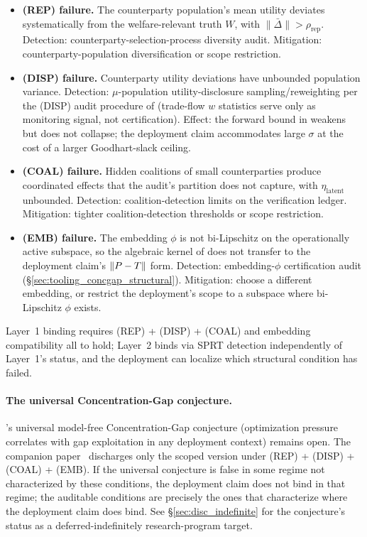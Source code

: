 \begin{itemize}
\item \textbf{(REP) failure.}  The counterparty population's mean
  utility deviates systematically from the welfare-relevant truth
  $W$, with $\|\bar\Delta\| > \rho_{\mathrm{rep}}$.  Detection:
  counterparty-selection-process diversity audit.  Mitigation:
  counterparty-population diversification or scope restriction.

\item \textbf{(DISP) failure.}  Counterparty utility deviations
  have unbounded population variance.  Detection: $\mu$-population
  utility-disclosure sampling/reweighting per the (DISP) audit
  procedure of \citep[\S 6]{lasser2026foundations} (trade-flow
  $w$ statistics serve only as monitoring signal, not
  certification).  Effect: the forward bound in
  \citep[Theorem~2]{lasser2026foundations} weakens but does not
  collapse; the deployment claim accommodates large $\sigma$ at
  the cost of a larger Goodhart-slack ceiling.

\item \textbf{(COAL) failure.}  Hidden coalitions of small
  counterparties produce coordinated effects that the audit's
  partition does not capture, with
  $\eta_{\mathrm{latent}}$ unbounded.  Detection:
  coalition-detection limits on the verification ledger.
  Mitigation: tighter coalition-detection thresholds or scope
  restriction.

\item \textbf{(EMB) failure.}  The embedding $\phi$ is not
  bi-Lipschitz on the operationally active subspace, so the
  algebraic kernel of \citep[Theorem~2]{lasser2026foundations}
  does not transfer to the deployment claim's $\|P -
  T\|$ form.  Detection: embedding-$\phi$ certification
  audit (\S\ref{sec:tooling_concgap_structural}).  Mitigation:
  choose a different embedding, or restrict the deployment's
  scope to a subspace where bi-Lipschitz $\phi$ exists.
\end{itemize}

Layer~1 binding requires (REP) + (DISP) + (COAL) and embedding
compatibility all to hold; Layer~2 binds via SPRT detection
independently of Layer~1's status, and the deployment can
localize which structural condition has failed.

\paragraph{The universal Concentration-Gap conjecture.}
\citep[Microfoundation]{lasser2026micro}'s universal model-free
Concentration-Gap conjecture (optimization pressure correlates
with gap exploitation in any deployment context) remains open.
The companion paper~\citep{lasser2026foundations} discharges only
the scoped version under (REP) + (DISP) + (COAL) + (EMB).  If
the universal conjecture is false in some regime not
characterized by these conditions, the deployment claim does not
bind in that
regime; the auditable conditions are precisely the ones that
characterize where the deployment claim does bind.  See
\S\ref{sec:disc_indefinite} for the conjecture's status as a
deferred-indefinitely research-program target.

